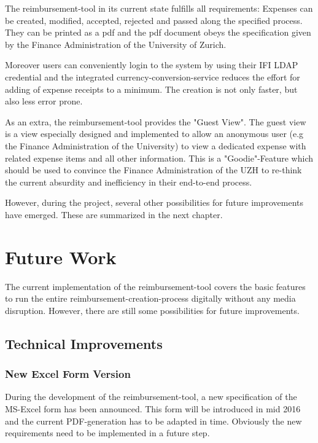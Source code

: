 The reimbursement-tool in its current state fulfills all requirements: Expenses can be created, modified, accepted, rejected and passed along the specified process. They can be printed as a pdf and the pdf document obeys the specification given by the Finance Administration of the University of Zurich. \par

Moreover users can conveniently login to the system by using their IFI LDAP credential and the integrated currency-conversion-service reduces the effort for adding of expense receipts to a minimum. The creation is not only faster, but also less error prone.\par

As an extra, the reimbursement-tool provides the "Guest View". The guest view is a view especially designed and implemented to allow an anonymous user (e.g the Finance Administration of the University) to view a dedicated expense with related expense items and all other information. This is a "Goodie"-Feature which should be used to convince the Finance Administration of the UZH to re-think the current absurdity and inefficiency in their end-to-end process.\par

However, during the project, several other possibilities for future improvements have emerged. These are summarized in the next chapter.

\section{Future Work}
\label{sec:future-work}

The current implementation of the reimbursement-tool covers the basic features to run the entire reimbursement-creation-process digitally without any media disruption. However, there are still some possibilities for future improvements.

\subsection{Technical Improvements}
\subsubsection{New Excel Form Version}
During the development of the reimbursement-tool, a new specification of the MS-Excel form has been announced. This form will be introduced in mid 2016 and the current PDF-generation has to be adapted in time. Obviously the new requirements need to be implemented in a future step.

